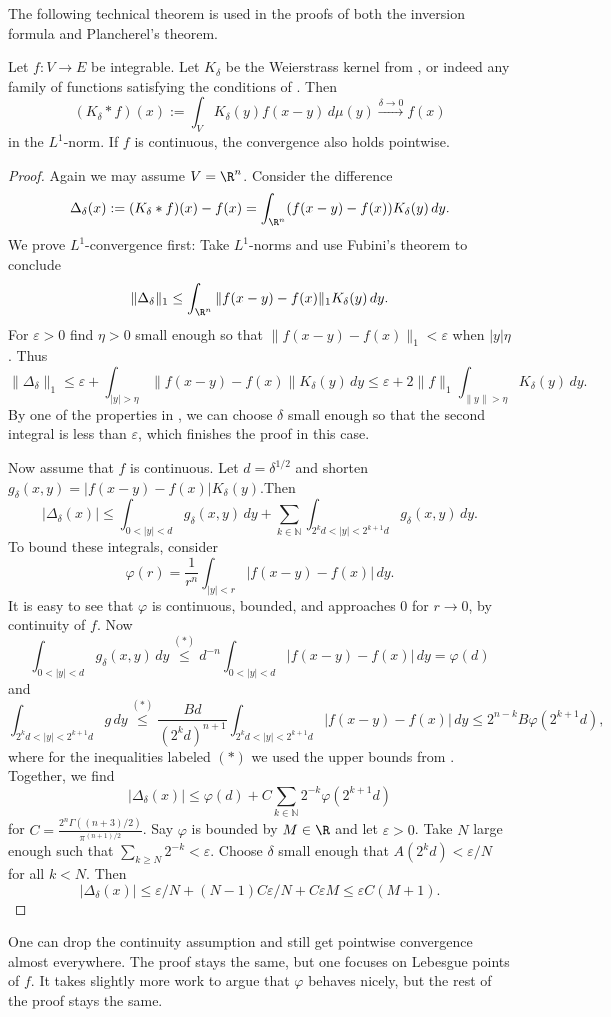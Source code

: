 The following technical theorem is used in the proofs of both the inversion formula and Plancherel's theorem.
\begin{theorem}
\label{thm:kernel-approximation}
\lean{}
Let $f:V\to E$ be integrable. Let $K_\delta$ be the Weierstrass kernel from ,
or indeed any family of functions satisfying the conditions of . Then
$$(K_\delta\ast f)(x):=\int_V K_\delta(y)f(x-y)\,d\mu(y)\xrightarrow{\delta\to0}f(x)$$ in the $L^1$-norm.
If $f$ is continuous, the convergence also holds pointwise.
\end{theorem}
\begin{proof}
Again we may assume $V=\R^n$. Consider the difference $$\Delta_\delta(x):=(K_\delta\ast f)(x)-f(x)=
\int_{\R^n}(f(x-y)-f(x))K_\delta(y)\,dy.$$ We prove $L^1$-convergence first:
Take $L^1$-norms and use Fubini's theorem to conclude
$$\|\Delta_\delta\|_1\leq\int_{\R^n}\|f(x-y)-f(x)\|_1K_\delta(y)\,dy.$$ For $\varepsilon>0$ find $\eta>0$
small enough so that $\|f(x-y)-f(x)\|_1<\varepsilon$ when $|y|\eta$. Thus
$$\|\Delta_\delta\|_1\leq\varepsilon+\int_{|y|>\eta}\|f(x-y)-f(x)\|K_\delta(y)\,dy\leq\varepsilon+2\|f\|_1\int_{\|y\|>\eta}K_\delta(y)\,dy.$$
By one of the properties in , we can choose $\delta$ small enough so that the second integral
is less than $\varepsilon$, which finishes the proof in this case.

Now assume that $f$ is continuous.
Let $d=\delta^{1/2}$ and shorten $g_\delta(x,y)=|f(x-y)-f(x)|K_\delta(y)$.Then
 $$|\Delta_\delta(x)|\leq\int_{0<|y|<d}g_\delta(x,y)\,dy+\sum_{k\in\mathbb N}\int_{2^kd<|y|<2^{k+1}d}g_\delta(x,y)\,dy.$$
 To bound these integrals, consider
 $$\varphi(r)=\frac1{r^n}\int_{|y|<r}|f(x-y)-f(x)|\,dy.$$
 It is easy to see that $\varphi$ is continuous, bounded, and approaches $0$ for $r\to0$, by continuity of $f$.
 Now $$\int_{0<|y|<d}g_\delta(x,y)\,dy\overset{(\ast)}\leq d^{-n}\int_{0<|y|<d}|f(x-y)-f(x)|\,dy=\varphi(d)$$ and
 $$\int_{2^kd<|y|<2^{k+1}d}g\,dy\overset{(\ast)}\leq
 \frac{Bd}{(2^kd)^{n+1}}\int_{2^kd<|y|<2^{k+1}d}|f(x-y)-f(x)|\,dy\leq2^{n-k}B\varphi(2^{k+1}d),$$
 where for the inequalities labeled $(\ast)$ we used the upper bounds from .
 Together, we find
 $$|\Delta_\delta(x)|\leq\varphi(d)+C\sum_{k\in\mathbb N}2^{-k}\varphi(2^{k+1}d)$$ for
 $C=\frac{2^n\Gamma((n+3)/2)}{\pi^{(n+1)/2}}$. Say $\varphi$ is bounded by $M\in\R$ and let $\varepsilon>0$.
 Take $N$ large enough such that $\sum_{k\geq N}2^{-k}<\varepsilon$. Choose $\delta$ small enough that
 $A(2^kd)<\varepsilon/N$ for all $k<N$. Then
 $$|\Delta_\delta(x)|\leq\varepsilon/N+(N-1)C\varepsilon/N+C\varepsilon M\leq \varepsilon C(M+1).$$
\end{proof}
\begin{remark}
  One can drop the continuity assumption and still get pointwise convergence almost everywhere. The proof stays the same,
  but one focuses on Lebesgue points of $f$. It takes slightly more work to argue that $\varphi$ behaves nicely,
  but the rest of the proof stays the same.
\end{remark}

